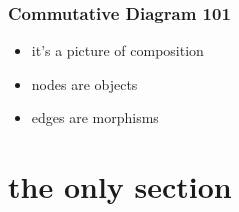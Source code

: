 \documentclass[include/preamble.tex]{subfiles}
\begin{document}
{

  \begin{frame}
    \frametitle{Commutative Diagram 101}
    \begin{itemize}
    \item it's a picture of composition
    \item nodes are objects
    \item edges are morphisms
    \end{itemize}
  \end{frame}

  
}





\section{the only section}
\end{document}
